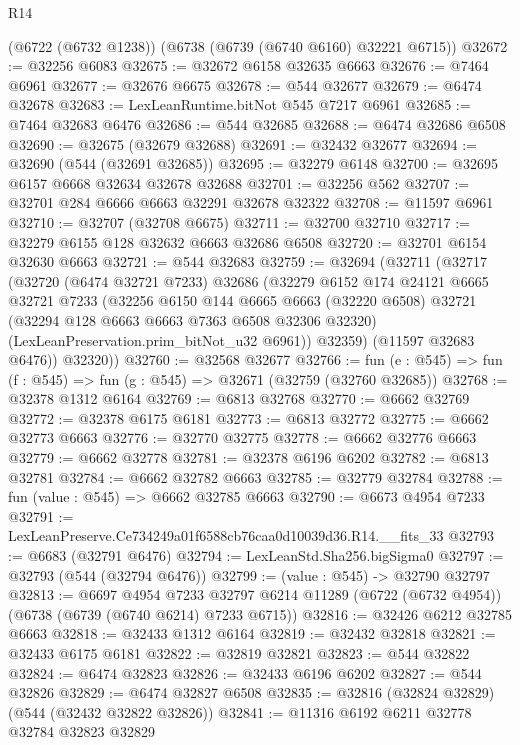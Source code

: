 \begin{lexlean}{R14}
\begin{coremodule}
    (@6722 (@6732 @1238))
    (@6738 (@6739 (@6740 @6160) @32221 @6715))
@32672 := @32256 @6083
@32675 := @32672 @6158 @32635 @6663
@32676 := @7464 @6961
@32677 := @32676 @6675
@32678 := @544 @32677
@32679 := @6474 @32678
@32683 := LexLeanRuntime.bitNot @545 @7217 @6961
@32685 := @7464 @32683 @6476
@32686 := @544 @32685
@32688 := @6474 @32686 @6508
@32690 := @32675 (@32679 @32688)
@32691 := @32432 @32677
@32694 := @32690 (@544 (@32691 @32685))
@32695 := @32279 @6148
@32700 := @32695 @6157 @6668 @32634 @32678 @32688
@32701 := @32256 @562
@32707 := @32701 @284 @6666 @6663 @32291 @32678 @32322
@32708 := @11597 @6961
@32710 := @32707 (@32708 @6675)
@32711 := @32700 @32710
@32717 := @32279 @6155 @128 @32632 @6663 @32686 @6508
@32720 := @32701 @6154 @32630 @6663
@32721 := @544 @32683
@32759 := @32694
    (@32711
      (@32717
        (@32720
          (@6474 @32721 @7233)
          @32686
          (@32279
            @6152
            @174
            @24121
            @6665
            @32721
            @7233
            (@32256
              @6150
              @144
              @6665
              @6663
              (@32220 @6508)
              @32721
              (@32294 @128 @6663 @6663 @7363 @6508 @32306 @32320)
              (LexLeanPreservation.prim_bitNot_u32 @6961))
            @32359)
          (@11597 @32683 @6476))
        @32320))
@32760 := @32568 @32677
@32766 := fun (e : @545) => fun (f : @545) => fun (g : @545) => @32671 (@32759 (@32760 @32685))
@32768 := @32378 @1312 @6164
@32769 := @6813 @32768
@32770 := @6662 @32769
@32772 := @32378 @6175 @6181
@32773 := @6813 @32772
@32775 := @6662 @32773 @6663
@32776 := @32770 @32775
@32778 := @6662 @32776 @6663
@32779 := @6662 @32778
@32781 := @32378 @6196 @6202
@32782 := @6813 @32781
@32784 := @6662 @32782 @6663
@32785 := @32779 @32784
@32788 := fun (value : @545) => @6662 @32785 @6663
@32790 := @6673 @4954 @7233
@32791 := LexLeanPreserve.Ce734249a01f6588cb76caa0d10039d36.R14.__fits_33
@32793 := @6683 (@32791 @6476)
@32794 := LexLeanStd.Sha256.bigSigma0
@32797 := @32793 (@544 (@32794 @6476))
@32799 := (value : @545) -> @32790 @32797
@32813 := @6697
    @4954
    @7233
    @32797
    @6214
    @11289
    (@6722 (@6732 @4954))
    (@6738 (@6739 (@6740 @6214) @7233 @6715))
@32816 := @32426 @6212 @32785 @6663
@32818 := @32433 @1312 @6164
@32819 := @32432 @32818
@32821 := @32433 @6175 @6181
@32822 := @32819 @32821
@32823 := @544 @32822
@32824 := @6474 @32823
@32826 := @32433 @6196 @6202
@32827 := @544 @32826
@32829 := @6474 @32827 @6508
@32835 := @32816 (@32824 @32829) (@544 (@32432 @32822 @32826))
@32841 := @11316 @6192 @6211 @32778 @32784 @32823 @32829

\end{coremodule}
\end{lexlean}

